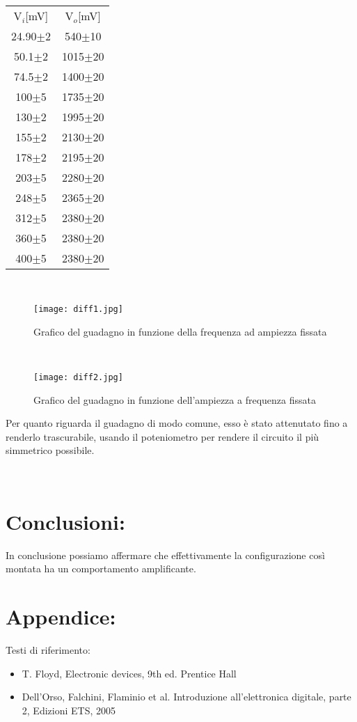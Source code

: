 \documentclass{article}
\begin{document}
~
\begin{table}[]
    \begin{center}
        \begin{tabular}{c|c}
        V$_{i}$[mV]&V$_{o}$[mV]\\
        24.90$\pm$2&540$\pm$10\\
        50.1$\pm$2&1015$\pm$20\\
        74.5$\pm$2&1400$\pm$20\\
        100$\pm$5&1735$\pm$20\\
        130$\pm$2&1995$\pm$20\\
        155$\pm$2&2130$\pm$20\\
        178$\pm$2&2195$\pm$20\\
        203$\pm$5&2280$\pm$20\\
        248$\pm$5&2365$\pm$20\\
        312$\pm$5&2380$\pm$20\\
        360$\pm$5&2380$\pm$20\\
        400$\pm$5&2380$\pm$20\\
        \end{tabular}
   \end{center}
\end{table} 
~
\begin{figure}[h!]
    \centering
    \texttt{[image: diff1.jpg]} 
    \caption{Grafico del guadagno in funzione della frequenza ad ampiezza fissata}
    \label{figura1}
\end{figure}
~
\begin{figure}[h!]
    \centering
    \texttt{[image: diff2.jpg]} 
    \caption{Grafico del guadagno in funzione dell'ampiezza a frequenza fissata}
    \label{figura1}
\end{figure}
Per quanto riguarda il guadagno di modo comune, esso è stato attenutato fino a renderlo trascurabile, usando il poteniometro per rendere il circuito il più simmetrico possibile. 


~
\section{Conclusioni:}
In conclusione possiamo affermare che effettivamente la configurazione così montata ha un comportamento amplificante.
~
\section{Appendice:}
Testi di riferimento:
\begin{itemize}
    \item T. Floyd, Electronic devices, 9th ed. Prentice Hall
    \item Dell’Orso, Falchini, Flaminio et al. Introduzione all’elettronica digitale,
parte 2, Edizioni ETS, 2005
\end{itemize}
\end{document}
